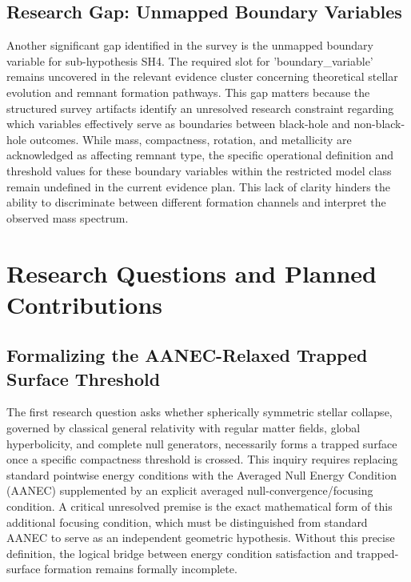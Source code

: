 \documentclass[conference]{IEEEtran}
\begin{document}
\subsection{Research Gap: Unmapped Boundary Variables}
Another significant gap identified in the survey is the unmapped boundary variable for sub-hypothesis SH4. The required slot for 'boundary\_variable' remains uncovered in the relevant evidence cluster concerning theoretical stellar evolution and remnant formation pathways. This gap matters because the structured survey artifacts identify an unresolved research constraint regarding which variables effectively serve as boundaries between black-hole and non-black-hole outcomes. While mass, compactness, rotation, and metallicity are acknowledged as affecting remnant type, the specific operational definition and threshold values for these boundary variables within the restricted model class remain undefined in the current evidence plan. This lack of clarity hinders the ability to discriminate between different formation channels and interpret the observed mass spectrum.

\section{Research Questions and Planned Contributions}
\subsection{Formalizing the AANEC-Relaxed Trapped Surface Threshold}
The first research question asks whether spherically symmetric stellar collapse, governed by classical general relativity with regular matter fields, global hyperbolicity, and complete null generators, necessarily forms a trapped surface once a specific compactness threshold is crossed. This inquiry requires replacing standard pointwise energy conditions with the Averaged Null Energy Condition (AANEC) supplemented by an explicit averaged null-convergence/focusing condition. A critical unresolved premise is the exact mathematical form of this additional focusing condition, which must be distinguished from standard AANEC to serve as an independent geometric hypothesis. Without this precise definition, the logical bridge between energy condition satisfaction and trapped-surface formation remains formally incomplete.
\end{document}
